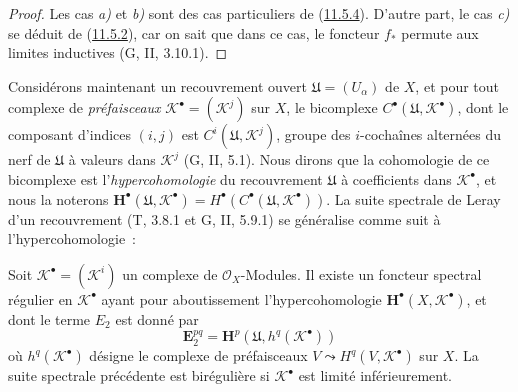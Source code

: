 \begin{proof}
Les cas \emph{a)} et \emph{b)} sont des cas particuliers de
(\hyperref[0.11.5.4-fr]{11.5.4}). D'autre part, le cas \emph{c)} se déduit de
(\hyperref[0.11.5.2-fr]{11.5.2}), car on sait que dans ce cas, le foncteur
$f_*$ permute aux limites inductives (G, II, 3.10.1).
\end{proof}

\begin{env}[12.4.5]
\label{0.12.4.5-fr}
Considérons maintenant un recouvrement ouvert
$\mathfrak U=(U_\alpha)$ de $X$, et pour tout complexe de
\emph{préfaisceaux} $\mathcal K^\bullet=(\mathcal K^j)$ sur $X$, le
bicomplexe $C^\bullet(\mathfrak U,\mathcal K^\bullet)$, dont le
composant d'indices $(i,j)$ est
$C^i(\mathfrak U,\mathcal K^j)$, groupe des $i$-cochaînes alternées
du nerf de $\mathfrak U$ à valeurs dans $\mathcal K^j$ (G, II, 5.1). Nous
dirons que la cohomologie de ce bicomplexe est
l'\emph{hypercohomologie} du recouvrement $\mathfrak U$ à coefficients dans
$\mathcal K^\bullet$, et nous la noterons
$\mathbf H^\bullet(\mathfrak U,\mathcal K^\bullet)=H^\bullet(C^\bullet(\mathfrak U,\mathcal K^\bullet))$.
La suite spectrale de Leray d'un recouvrement (T, 3.8.1 et G, II, 5.9.1)
se généralise comme suit à l'hypercohomologie~:
\end{env}

\begin{proposition}[12.4.6]
\label{0.12.4.6-fr}
Soit $\mathcal K^\bullet=(\mathcal K^i)$ un complexe de
$\mathcal O_X$-Modules. Il existe un foncteur spectral régulier en
$\mathcal K^\bullet$ ayant pour aboutissement l'hypercohomologie
$\mathbf H^\bullet(X,\mathcal K^\bullet)$, et dont le terme $E_2$ est donné
par
\begin{equation}
\label{0.12.4.6.1-fr}
\tag{12.4.6.1}
\mathbf{E}_2^{pq}=\mathbf H^p(\mathfrak U,h^q(\mathcal K^\bullet))
\end{equation}
où $h^q(\mathcal K^\bullet)$ désigne le complexe de préfaisceaux
$V\leadsto H^q(V,\mathcal K^\bullet)$ sur $X$. La suite spectrale précédente
est birégulière si $\mathcal K^\bullet$ est limité inférieurement.
\end{proposition}

